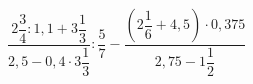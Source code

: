 \begin{ex}[type=calculate]
	\begin{condition}
		\( \dfrac{2\dfrac{3}{4}:1,1+3\dfrac{1}{3}}{2,5-0,4\cdot3\dfrac{1}{3}}:\dfrac{5}{7}-\dfrac{\left( 2\dfrac{1}{6}+4,5 \right)\cdot0,375}{2,75-1\dfrac{1}{2}} \)
	\end{condition}
\end{ex}